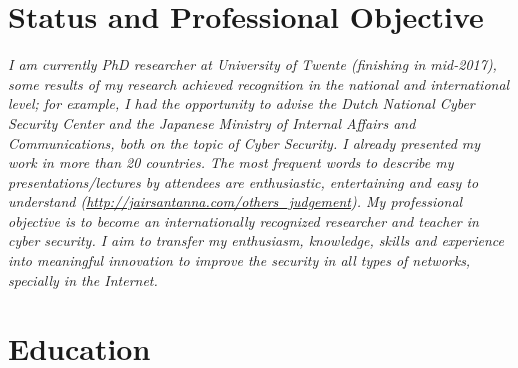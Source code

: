 \documentclass[print]{styles/friggeri-cv-mac} %
\begin{document}
\section{Status and Professional Objective}\vspace{-10pt}
\noindent\setlength\parindent{12pt}\textit{
I am currently PhD researcher at University of Twente (finishing in mid-2017),
some results of my research achieved recognition in the national and
international level; for example, I had the opportunity to advise the Dutch National Cyber
Security Center and the Japanese Ministry of Internal Affairs and
Communications, both on the topic of Cyber Security. I already presented my work
in more than 20 countries. The most frequent words to describe my
presentations/lectures by attendees are enthusiastic, entertaining and easy to
understand (\url{http://jairsantanna.com/others_judgement}). 
My professional objective is to become an internationally recognized researcher
and teacher in cyber security. I aim to transfer my enthusiasm, knowledge,
skills and experience into meaningful innovation to improve the security in all
types of networks, specially in the Internet.  }


\setlength\parindent{0pt}
\section{Education}\vspace{-5pt}
\end{document}
